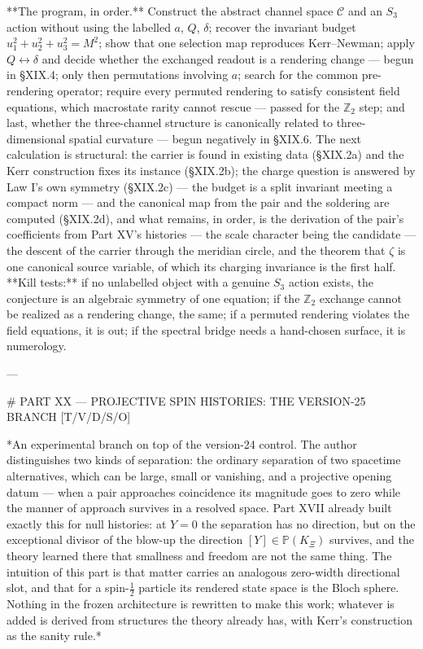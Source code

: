 **The program, in order.** Construct the abstract channel space $\mathcal C$ and an $S_3$ action without using the labelled $a$, $Q$, $\delta$; recover the invariant budget $u_1^2+u_2^2+u_3^2 = M^2$; show that one selection map reproduces Kerr–Newman; apply $Q\leftrightarrow\delta$ and decide whether the exchanged readout is a rendering change — begun in §XIX.4; only then permutations involving $a$; search for the common pre-rendering operator; require every permuted rendering to satisfy consistent field equations, which macrostate rarity cannot rescue — passed for the $\mathbb Z_2$ step; and last, whether the three-channel structure is canonically related to three-dimensional spatial curvature — begun negatively in §XIX.6. The next calculation is structural: the carrier is found in existing data (§XIX.2a) and the Kerr construction fixes its instance (§XIX.2b); the charge question is answered by Law I's own symmetry (§XIX.2c) — the budget is a split invariant meeting a compact norm — and the canonical map from the pair and the soldering are computed (§XIX.2d), and what remains, in order, is the derivation of the pair's coefficients from Part XV's histories — the scale character being the candidate — the descent of the carrier through the meridian circle, and the theorem that $\zeta$ is one canonical source variable, of which its charging invariance is the first half. **Kill tests:** if no unlabelled object with a genuine $S_3$ action exists, the conjecture is an algebraic symmetry of one equation; if the $\mathbb Z_2$ exchange cannot be realized as a rendering change, the same; if a permuted rendering violates the field equations, it is out; if the spectral bridge needs a hand-chosen surface, it is numerology.

---

# PART XX — PROJECTIVE SPIN HISTORIES: THE VERSION-25 BRANCH [T/V/D/S/O]

*An experimental branch on top of the version-24 control. The author distinguishes two kinds of separation: the ordinary separation of two spacetime alternatives, which can be large, small or vanishing, and a projective opening datum — when a pair approaches coincidence its magnitude goes to zero while the manner of approach survives in a resolved space. Part XVII already built exactly this for null histories: at $Y = 0$ the separation has no direction, but on the exceptional divisor of the blow-up the direction $[Y]\in\mathbb P(K_\Xi)$ survives, and the theory learned there that smallness and freedom are not the same thing. The intuition of this part is that matter carries an analogous zero-width directional slot, and that for a spin-$\tfrac12$ particle its rendered state space is the Bloch sphere. Nothing in the frozen architecture is rewritten to make this work; whatever is added is derived from structures the theory already has, with Kerr's construction as the sanity rule.*

